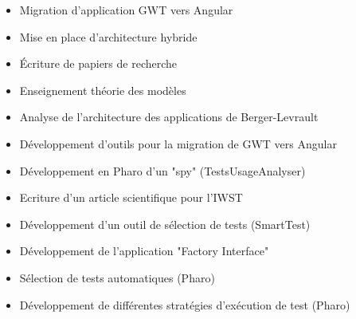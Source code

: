 \documentclass[10pt,a4paper,ragged2e,withhyper]{altacv}
\begin{document}
\begin{paracol}{2}

\begin{itemize}
\item Migration d'application GWT vers Angular
\item Mise en place d'architecture hybride
\item Écriture de papiers de recherche
\item Enseignement théorie des modèles
\end{itemize}

\divider

\begin{itemize}
\item Analyse de l’architecture des applications de Berger-Levrault
\item Développement d'outils pour la migration de GWT vers Angular
\end{itemize}

\divider

\begin{itemize}
  \item Développement en Pharo d'un "spy" (TestsUsageAnalyser)
  \item Ecriture d'un article scientifique pour l'IWST
  \item Développement d'un outil de sélection de tests (SmartTest)
\end{itemize}

\divider

\begin{itemize}
  \item Développement de l'application "Factory Interface"
\end{itemize}



\begin{itemize}
\item Sélection de tests automatiques (Pharo)
\item Développement de différentes stratégies d’exécution de test (Pharo)
\end{itemize}


\end{paracol}
\end{document}
